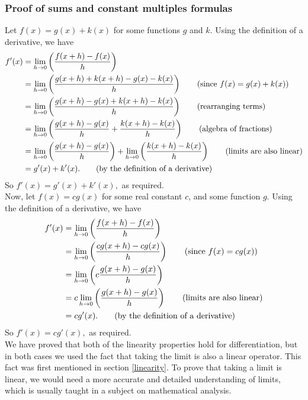 \subsubsection{Proof of sums and constant multiples formulas}
Let $f(x) = g(x) + k(x)$ for some functions $g$ and $k$. Using the definition of a derivative, we have
\begin{align*}
f'(x) 	& = \lim_{h \rightarrow 0}\left(\frac{f(x+h) - f(x)}{h}\right) \\
	& = \lim_{h \rightarrow 0}\left(\frac{g(x+h) + k(x+h) - g(x) - k(x)}{h}\right) \tag{since $f(x) = g(x) + k(x)$} \\
	& = \lim_{h \rightarrow 0}\left(\frac{g(x+h) - g(x) + k(x+h) - k(x)}{h}\right) \tag{rearranging terms} \\
	& = \lim_{h \rightarrow 0}\left(\frac{g(x+h) - g(x)}{h} + \frac{k(x+h) - k(x)}{h}\right) \tag{algebra of fractions} \\
	& =  \lim_{h \rightarrow 0}\left(\frac{g(x+h) - g(x)}{h}\right) + \lim_{h \rightarrow 0}\left(\frac{k(x+h) - k(x)}{h}\right) \tag{limits are also linear} \\
	& = g'(x) + k'(x). \tag{by the definition of a derivative}
\end{align*} 
So $f'(x) = g'(x) + k'(x),$ as required. \\

\noindent Now, let $f(x) = cg(x)$ for some real constant $c$, and some function $g$. Using the definition of a derivative, we have
\begin{align*}
f'(x) 	& = \lim_{h \rightarrow 0}\left(\frac{f(x+h) - f(x)}{h}\right) \\
	& = \lim_{h \rightarrow 0}\left(\frac{cg(x+h) - cg(x)}{h}\right) \tag{since $f(x) = cg(x)$} \\
	& = \lim_{h \rightarrow 0}\left(c\frac{g(x+h) - g(x)}{h}\right) \\
	& = c\lim_{h \rightarrow 0}\left(\frac{g(x+h) - g(x)}{h}\right) \tag{limits are also linear} \\
	& = cg'(x). \tag{by the definition of a derivative}
\end{align*}
So $f'(x) = cg'(x),$ as required. \\

\noindent We have proved that both of the linearity properties hold for differentiation, but in both cases we used the fact that taking the limit is also a linear operator. This fact was first mentioned in section \ref{linearity}. To prove that taking a limit is linear, we would need a more accurate and detailed understanding of limits, which is usually taught in a subject on mathematical analysis.

